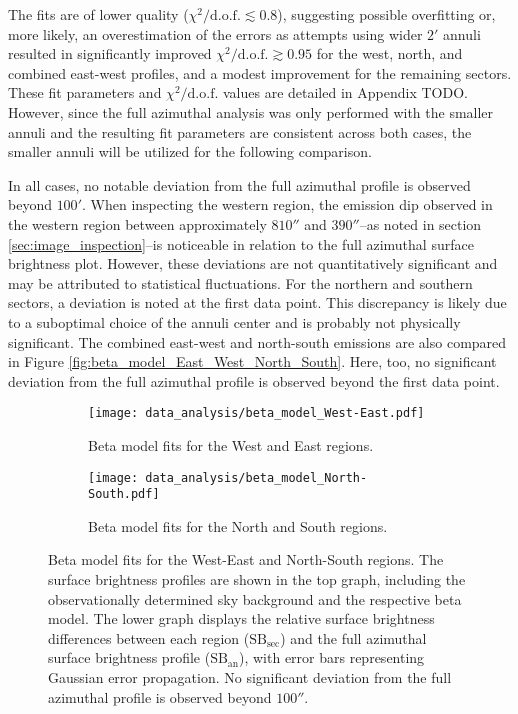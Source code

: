 The fits are of lower quality ($\chi^2 / \text{d.o.f.} \lesssim 0.8$), suggesting possible overfitting or, more likely, an overestimation of the errors as attempts using wider $2'$ annuli resulted in significantly improved $\chi^2 / \text{d.o.f.} \gtrsim 0.95$ for the west, north, and combined east-west profiles, and a modest improvement for the remaining sectors. These fit parameters and $\chi^2 / \text{d.o.f.}$ values are detailed in Appendix TODO. However, since the full azimuthal analysis was only performed with the smaller annuli and the resulting fit parameters are consistent across both cases, the smaller annuli will be utilized for the following comparison. 

In all cases, no notable deviation from the full azimuthal profile is observed beyond \(100'\). When inspecting the western region, the emission dip observed in the western region between approximately \(810''\) and \(390''\)--as noted in section \ref{sec:image_inspection}--is noticeable in relation to the full azimuthal surface brightness plot. However, these deviations are not quantitatively significant and may be attributed to statistical fluctuations. For the northern and southern sectors, a deviation is noted at the first data point. This discrepancy is likely due to a suboptimal choice of the annuli center and is probably not physically significant. The combined east-west and north-south emissions are also compared in Figure \ref{fig:beta_model_East_West_North_South}. Here, too, no significant deviation from the full azimuthal profile is observed beyond the first data point.
\begin{figure}[htbp]
    \centering
    \begin{subfigure}{\textwidth}
        \centering
        \texttt{[image: data\_analysis/beta\_model\_West-East.pdf]}
        \caption{Beta model fits for the West and East regions.}
        \label{fig:beta_model_West_East}
    \end{subfigure}
    \vspace{0.5cm} 
    \begin{subfigure}{\textwidth}
        \centering
        \texttt{[image: data\_analysis/beta\_model\_North-South.pdf]}
        \caption{Beta model fits for the North and South regions.}
        \label{fig:beta_model_North_South}
    \end{subfigure}
    \caption{Beta model fits for the West-East and North-South regions. The surface brightness profiles are shown in the top graph, including the observationally determined sky background and the respective beta model. The lower graph displays the relative surface brightness differences between each region (\(\text{SB}_{\text{sec}}\)) and the full azimuthal surface brightness profile (\(\text{SB}_{\text{an}}\)), with error bars representing Gaussian error propagation. No significant deviation from the full azimuthal profile is observed beyond \(100''\).}
    \label{fig:beta_models_West_North}
\end{figure}
